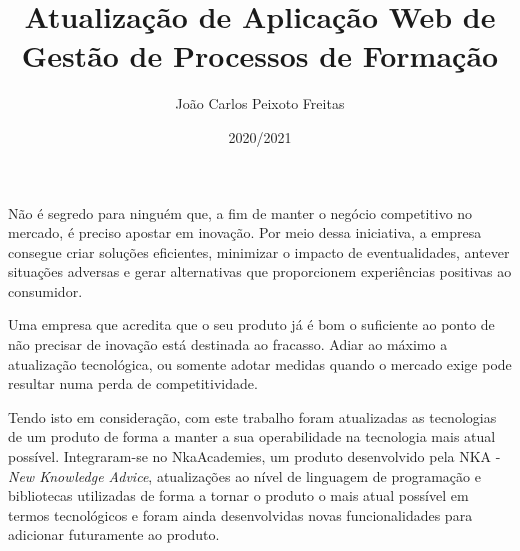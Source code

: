 \documentclass[a4paper,12pt,twoside]{book}
\title{Atualização de Aplicação Web de Gestão de Processos de Formação}
\author{João Carlos Peixoto Freitas}
\date{2020/2021}
\begin{document}
\frontmatter
\maketitle  %


\begin{resumo}

\par Não é segredo para ninguém que, a fim de manter o negócio competitivo no mercado, é preciso apostar em inovação. Por meio dessa iniciativa, a empresa consegue criar soluções eficientes, minimizar o impacto de eventualidades, antever situações adversas e gerar alternativas que proporcionem experiências positivas ao consumidor.
\par Uma empresa que acredita que o seu produto já é bom o suficiente ao ponto de não precisar de inovação está destinada ao fracasso. Adiar ao máximo a atualização tecnológica, ou somente adotar medidas quando o mercado exige pode resultar numa perda de competitividade.
\par Tendo isto em consideração, com este trabalho foram atualizadas as tecnologias de um produto de forma a manter a sua operabilidade na tecnologia mais atual possível. Integraram-se no NkaAcademies, um produto desenvolvido pela NKA - \textit{New Knowledge Advice}, atualizações ao nível de linguagem de programação e bibliotecas utilizadas de forma a tornar o produto o mais atual possível em termos tecnológicos e foram ainda desenvolvidas novas funcionalidades para adicionar futuramente ao produto.


\end{resumo}
\end{document}
